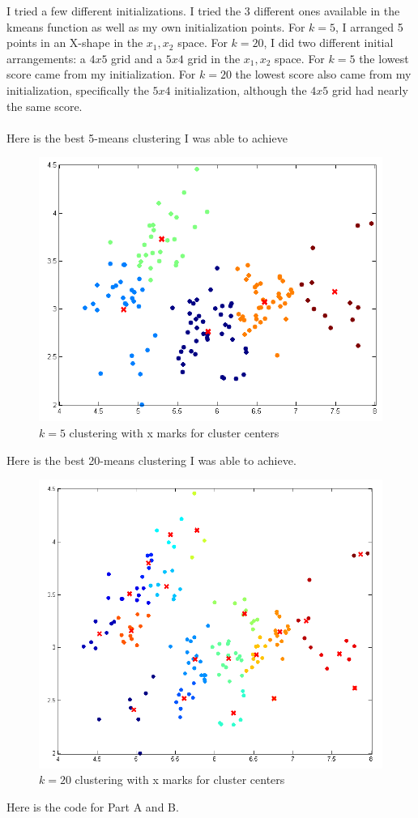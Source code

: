 \documentclass[twoside,11pt]{article}
\theoremstyle{definition}
\begin{document}
I tried a few different initializations. I tried the 3 different ones available in the kmeans function as well as my own initialization points. For $k=5$, I arranged 5 points in an X-shape in the $x_1,x_2$ space. For $k=20$, I did two different initial arrangements: a $4x5$ grid and a $5x4$ grid in the $x_1,x_2$ space. For $k=5$ the lowest score came from my initialization. For $k=20$ the lowest score also came from my initialization, specifically the $5x4$ initialization, although the $4x5$ grid had nearly the same score. \\
\\
Here is the best 5-means clustering I was able to achieve
\begin{figure}[h]
\centering
\includegraphics[width=6 in]{prob1PartB_1.png}
\caption{$k=5$ clustering with x marks for cluster centers}
\end{figure}

\newpage

Here is the best 20-means clustering I was able to achieve.
\begin{figure}[h]
\centering
\includegraphics[width=6 in]{prob1PartB_2.png}
\caption{$k=20$ clustering with x marks for cluster centers}
\end{figure}

\newpage

Here is the code for Part A and B.

\end{document}
